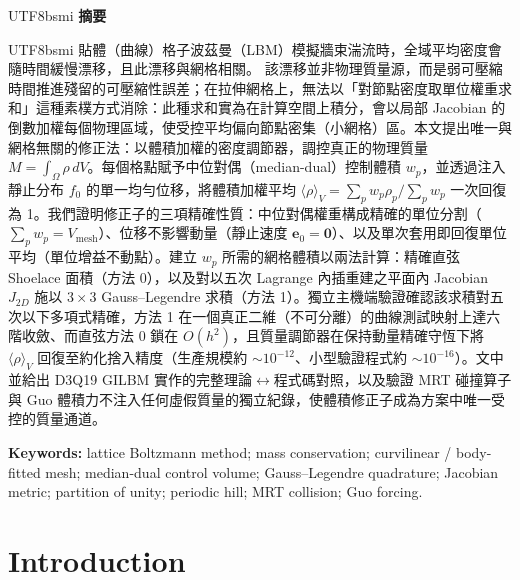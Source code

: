 \documentclass[11pt]{article}
\theoremstyle{definition}
\theoremstyle{remark}
\begin{document}
\begin{center}
\begin{CJK}{UTF8}{bsmi}
\textbf{摘要}\\[4pt]
\end{CJK}
\begin{minipage}{0.92\textwidth}
\begin{CJK}{UTF8}{bsmi}
\small
貼體（曲線）格子波茲曼（LBM）模擬牆束湍流時，全域平均密度會隨時間緩慢漂移，且此漂移與網格相關。
該漂移並非物理質量源，而是弱可壓縮時間推進殘留的可壓縮性誤差；在拉伸網格上，無法以「對節點密度取單位權重求和」這種素樸方式消除：此種求和實為在計算空間上積分，會以局部 Jacobian 的倒數加權每個物理區域，使受控平均偏向節點密集（小網格）區。本文提出唯一與網格無關的修正法：以體積加權的密度調節器，調控真正的物理質量
$M=\int_\Omega\rho\,dV$。每個格點賦予中位對偶（median-dual）控制體積 $w_p$，並透過注入靜止分布
$f_0$ 的單一均勻位移，將體積加權平均
$\langle\rho\rangle_V=\sum_p w_p\rho_p/\sum_p w_p$ 一次回復為 1。我們證明修正子的三項精確性質：中位對偶權重構成精確的單位分割（$\sum_p w_p=V_{\mathrm{mesh}}$）、位移不影響動量（靜止速度 $\mathbf e_0=\mathbf0$）、以及單次套用即回復單位平均（單位增益不動點）。建立 $w_p$ 所需的網格體積以兩法計算：精確直弦 Shoelace 面積（方法 0），以及對以五次 Lagrange 內插重建之平面內 Jacobian $J_{2D}$ 施以 $3\times3$ Gauss--Legendre 求積（方法 1）。獨立主機端驗證確認該求積對五次以下多項式精確，方法 1 在一個真正二維（不可分離）的曲線測試映射上達六階收斂、而直弦方法 0 鎖在 $O(h^2)$，且質量調節器在保持動量精確守恆下將 $\langle\rho\rangle_V$ 回復至約化捨入精度（生產規模約 $\sim\!10^{-12}$、小型驗證程式約 $\sim\!10^{-16}$）。文中並給出 D3Q19 GILBM 實作的完整理論$\leftrightarrow$程式碼對照，以及驗證 MRT 碰撞算子與 Guo 體積力不注入任何虛假質量的獨立紀錄，使體積修正子成為方案中唯一受控的質量通道。
\end{CJK}
\end{minipage}
\end{center}

\vspace{4pt}
\noindent\textbf{Keywords:} lattice Boltzmann method; mass conservation;
curvilinear / body-fitted mesh; median-dual control volume; Gauss--Legendre
quadrature; Jacobian metric; partition of unity; periodic hill; MRT collision;
Guo forcing.

\tableofcontents

\section{Introduction}
\label{sec:intro}
\end{document}
